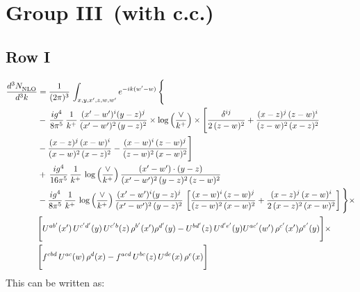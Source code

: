 \documentclass[9pt]{article}
\numberwithin{equation}{section}
\begin{document}
\section{Group III\, (with c.c.)}
\subsection{Row I}
\begin{align}
     \frac{d^{3}N_{\rm NLO}^{\rm}}{d^{3}k}  & =   \frac{1}{(2\pi)^{3}}\, \int_{x,y,x',z,w,w^{\prime}} e^{-ik(w^{\prime}-w)}\, \Bigg\{\notag \\
& -\,\frac{ig^{4}}{8\pi^{5}}\,\frac{1}{k^{+}}\,\frac{(x'-w')^{i}(y-z)^{j}}{(x'-w')^{2}\,(y-z)^{2}}\times \log{\left(\frac{\vee}{k^{+}}\right)}\times \Bigg[\frac{\delta^{ij}}{2\,(z-w)^{2}}+\frac{(x-z)^{j}\,(z-w)^{i}}{(z-w)^{2}\,(x-z)^{2}}\notag \\ & -\frac{(x-z)^{j}\,(x-w)^{i}}{(x-w)^{2}\,(x-z)^{2}}-\frac{(x-w)^{i}\,(z-w)^{j}}{(z-w)^{2}\,(x-w)^{2}}\Bigg] \notag \\
& +\,\frac{ig^{4}}{16\pi^{5}}\,\frac{1}{k^{+}}\,\log{\left(\frac{\vee}{k^{+}}\right)}\, \frac{(x'-w')\cdot (y-z)}{(x'-w')^{2}\,(y-z)^{2}\,(z-w)^{2}} \notag \\
& -\frac{ig^{4}}{8\pi^{5}}\,\frac{1}{k^{+}}\,\log{\left(\frac{\vee}{k^{+}}\right)}\,\frac{(x'-w')^{i}(y-z)^{j}}{(x'-w')^{2}\,(y-z)^{2}}\,\left[\frac{(x-w)^{i}\,(z-w)^{j}}{(z-w)^{2}\,(x-w)^{2}}+\frac{(x-z)^{j}\,(x-w)^{i}}{2\,(x-z)^{2}\, (x-w)^{2}}\right]\Bigg\}\times \notag \\ &  \Bigg[U^{ab'}(x')\,U^{c'd'}(y)\,U^{c'b}(z)\,\rho^{b'}(x')\rho^{d'}(y)-U^{bd'}(z)\,U^{d'e'}(y)U^{ac'}(w')\,\rho^{c'}(x')\rho^{e'}(y)\Bigg]\times\notag \\ & \Bigg[f^{cbd}\,U^{ac}(w)\,\rho^{d}(x)-f^{acd}\, U^{bc}(z)\,U^{de}(x)\,\rho^{e}(x)\Bigg]
\end{align}
This can be written as: 
\end{document}
